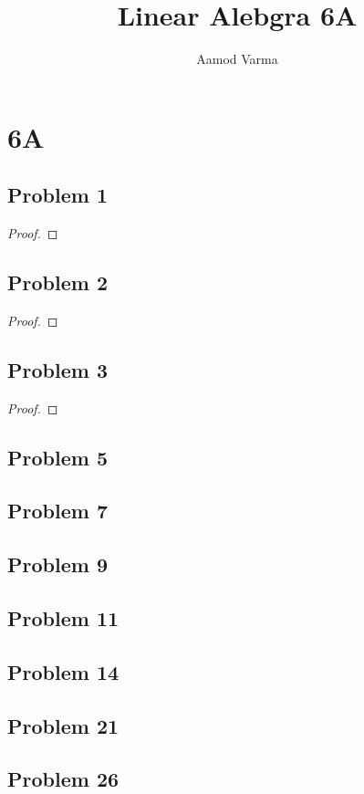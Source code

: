 \documentclass[a4paper]{report}
\title{Linear Alebgra 6A}
\author{Aamod Varma}
\begin{document}
\maketitle
\date{}

\section*{6A}
\subsection*{Problem 1}
\begin{proof}
   
\end{proof}
\subsection*{Problem 2}
\begin{proof}
\end{proof}
\subsection*{Problem 3}
\begin{proof}
   
\end{proof}
\subsection*{Problem 5}
\subsection*{Problem 7}
\subsection*{Problem 9}
\subsection*{Problem 11}
\subsection*{Problem 14}
\subsection*{Problem 21}
\subsection*{Problem 26}
\end{document}
